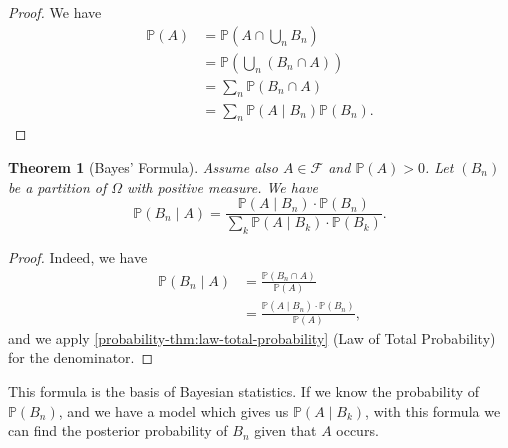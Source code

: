 \documentclass[11pt]{article}
\numberwithin{equation}{section}
\newtheorem{theorem}{Theorem}[section]
\theoremstyle{definition}
\theoremstyle{remark}
\newcommand{\pqty}[1]{\left(#1\right)}
\newcommand{\eventSpace}{\mathcal F}
\newcommand{\Prob}{\mathbb P}
\newcommand{\Conditional}[2]{#1\mid #2}
\begin{document}
\begin{proof}\label{probability-proof-015}
    We have
    \begin{align*}
        \Prob\pqty{A} &= \Prob\pqty{A \cap \bigcup_{n} B_n} \\
        &= \Prob\pqty{\bigcup_n \pqty{B_n \cap A}} \\
        &= \sum_{n} \Prob\pqty{B_n \cap A} \\
        &= \sum_{n} \Prob\pqty{\Conditional{A}{B_n}} \Prob\pqty{B_n}.
    \end{align*}
\end{proof}

\begin{theorem}[Bayes' Formula]\label{probability-theorem-004}
    \label{probability-thm:bayes}%
Assume also \(A\in\eventSpace\) and \(\Prob(A)>0\).
    Let \(\pqty{B_n}\) be a partition of \(\Omega\) with positive measure. We have
    \[
        \Prob\pqty{\Conditional{B_n}{A}} = \frac{\Prob\pqty{\Conditional{A}{B_n}} \cdot \Prob\pqty{B_n}}{\sum_{k} \Prob\pqty{\Conditional{A}{B_k}} \cdot \Prob\pqty{B_k}}.
    \]
\end{theorem}

\begin{proof}\label{probability-proof-016}
    Indeed, we have
    \begin{align*}
        \Prob\pqty{\Conditional{B_n}{A}} &= \frac{\Prob\pqty{B_n \cap A}}{\Prob\pqty{A}} \\
        &= \frac{\Prob\pqty{\Conditional{A}{B_n}} \cdot \Prob\pqty{B_n}}{\Prob\pqty{A}},
    \end{align*}
    and we apply \autoref{probability-thm:law-total-probability} (Law of Total Probability) for the denominator.
\end{proof}

This formula is the basis of Bayesian statistics. If we know the probability of \(\Prob\pqty{B_n}\), and we have a model which gives us \(\Prob\pqty{\Conditional{A}{B_k}}\), with this formula we can find the posterior probability of \(B_n\) given that \(A\) occurs.
\end{document}
